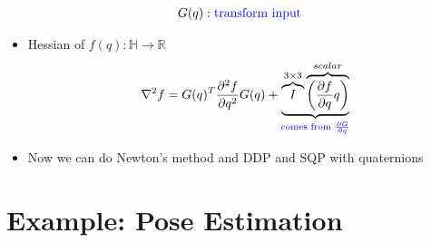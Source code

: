 \documentclass[11pt]{article}
\begin{document}
\begin{itemize}
\begin{align*}
        \\
        G(q)&: \textcolor{blue}{\text{transform input}}
    \end{align*}
    \item Hessian of $f(q): \mathbb{H}\rightarrow \mathbb{R}$
    \begin{align*}
        \nabla^2f = G(q)^T\frac{\partial^2 f}{\partial q^2}G(q) + \underbrace{\overbrace{I}^{3\times3}\overbrace{\left( \frac{\partial f}{\partial q}q \right)}^{scalar}}_{\textcolor{blue}{\text{comes from }\frac{\partial G}{\partial q}}}
    \end{align*}
    \item Now we can do Newton's method and DDP and SQP with quaternions
\end{itemize}

\section{Example: Pose Estimation}
\end{document}
